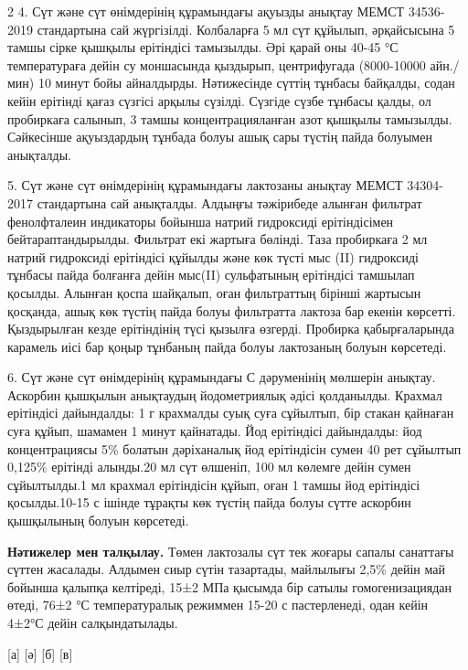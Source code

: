 \begin{multicols}{2}
4. Сүт және сүт өнімдерінің құрамындағы ақуызды анықтау МЕМСТ 34536-2019
стандартына сай жүргізілді. Колбаларға 5 мл сүт құйылып, әрқайсысына 5
тамшы сірке қышқылы ерітіндісі тамызылды. Әрі қарай оны 40-45 °С
температураға дейін су моншасында қыздырып, центрифугада (8000-10000
айн./мин) 10 минут бойы айналдырды. Нәтижесінде сүттің тұнбасы байқалды,
содан кейін ерітінді қағаз сүзгісі арқылы сүзілді. Сүзгіде сүзбе тұнбасы
қалды, ол пробиркаға салынып, 3 тамшы концентрацияланған азот қышқылы
тамызылды. Сәйкесінше ақуыздардың тұнбада болуы ашық сары түстің пайда
болуымен анықталды.

5. Сүт және сүт өнімдерінің құрамындағы лактозаны анықтау МЕМСТ
34304-2017 стандартына сай анықталды. Алдыңғы тәжірибеде алынған
фильтрат фенолфталеин индикаторы бойынша натрий гидроксиді ерітіндісімен
бейтараптандырылды. Фильтрат екі жартыға бөлінді. Таза пробиркаға 2 мл
натрий гидроксиді ерітіндісі құйылды және көк түсті мыс (II) гидроксиді
тұнбасы пайда болғанға дейін мыс(II) сульфатының ерітіндісі тамшылап
қосылды. Алынған қоспа шайқалып, оған фильтраттың бірінші жартысын
қосқанда, ашық көк түстің пайда болуы фильтратта лактоза бар екенін
көрсетті. Қыздырылған кезде ерітіндінің түсі қызылға өзгерді. Пробирка
қабырғаларында карамель иісі бар қоңыр тұнбаның пайда болуы лактозаның
болуын көрсетеді.

6. Сүт және сүт өнімдерінің құрамындағы С дәруменінің мөлшерін анықтау.
Аскорбин қышқылын анықтаудың йодометриялық әдісі қолданылды. Крахмал
ерітіндісі дайындалды: 1 г крахмалды суық суға сұйылтып, бір стакан
қайнаған суға құйып, шамамен 1 минут қайнатады. Йод ерітіндісі
дайындалды: йод концентрациясы 5\% болатын дәріханалық йод ерітіндісін
сумен 40 рет сұйылтып 0,125\% ерітінді алынды.20 мл сүт өлшеніп, 100 мл
көлемге дейін сумен сұйылтылды.1 мл крахмал ерітіндісін құйып, оған 1
тамшы йод ерітіндісі қосылды.10-15 с ішінде тұрақты көк түстің пайда
болуы сүтте аскорбин қышқылының болуын көрсетеді.

{\bfseries Нәтижелер мен талқылау.} Төмен лактозалы сүт тек жоғары сапалы
санаттағы сүттен жасалады. Алдымен сиыр сүтін тазартады, майлылығы 2,5\%
дейін май бойынша қалыпқа келтіреді, 15±2 МПа қысымда бір сатылы
гомогенизациядан өтеді, 76±2 °С температуралық режиммен 15-20 с
пастерленеді, одан кейін 4±2°С дейін салқындатылады.
\end{multicols}
\vspace{1em}
\begin{figs}
    [а]
    [ә]
    [б]
    [в]
\end{figs}

